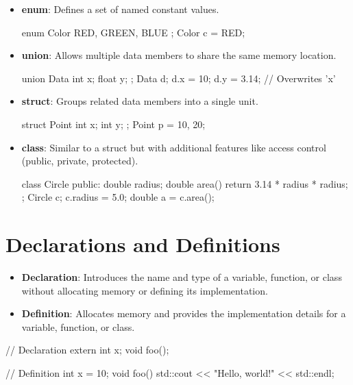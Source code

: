 \begin{itemize}
    \item \textbf{enum}: Defines a set of named constant values.
    \begin{codeblock}[language=C++]
enum Color { RED, GREEN, BLUE };
Color c = RED;
    \end{codeblock}
    \item \textbf{union}: Allows multiple data members to share the same memory location.
    \begin{codeblock}[language=C++]
union Data {
    int x;
    float y;
};
Data d;
d.x = 10;
d.y = 3.14; // Overwrites 'x'
    \end{codeblock}
    \item \textbf{struct}: Groups related data members into a single unit.
    \begin{codeblock}[language=C++]
struct Point {
    int x;
    int y;
};
Point p = {10, 20};
    \end{codeblock}
    \item \textbf{class}: Similar to a struct but with additional features like access control (public, private, protected).
    \begin{codeblock}[language=C++]
class Circle {
public:
    double radius;
    double area() {
        return 3.14 * radius * radius;
    }
};
Circle c;
c.radius = 5.0;
double a = c.area();
    \end{codeblock}
\end{itemize}



\section{Declarations and Definitions}

\begin{itemize}
    \item \textbf{Declaration}: Introduces the name and type of a variable, function, or class without allocating memory or defining its implementation.
    \item \textbf{Definition}: Allocates memory and provides the implementation details for a variable, function, or class.
\end{itemize}

\begin{exampleblock}
\begin{codeblock}[language=C++]
// Declaration
extern int x;
void foo();

// Definition
int x = 10;
void foo() {
    std::cout << "Hello, world!" << std::endl;
}
\end{codeblock}
\end{exampleblock}



